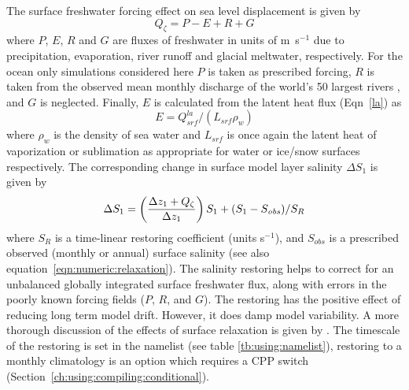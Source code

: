 The surface freshwater forcing effect on sea level displacement
is given by
\begin{equation}
\label{eqn:sfwf1}
Q_{\zeta} = P - E + R + G
\end{equation}
where $P$, $E$, $R$ and $G$ are fluxes of freshwater in units of \mbox{m s$^{-1}$} due to
precipitation, evaporation, river runoff and glacial meltwater, respectively.
For the ocean only simulations considered here 
$P$ is taken as prescribed forcing,
$R$ is taken from
the observed mean monthly discharge of the world's 50 largest rivers \citep{duemenil93},
and $G$ is neglected.
Finally, $E$ is calculated from the latent heat flux (Eqn~\ref{la}) as
\begin{equation}
\label{eqn:evap}
E = 
Q_{\mathit{srf}}^{\mathit{la}}/(L_{\mathit{srf}}\rho_{w})
\end{equation}
where 
$\rho_{w}$ is the density of sea water and $L_{\mathit{srf}}$
is once again the latent heat of vaporization or sublimation as appropriate
for water or ice/snow surfaces respectively.
The corresponding change in surface model layer salinity $\Delta S_1$ is given by
\begin{equation}
\label{eqn:numeric:sfwf2}
\Delta S_1 = \left( {\Delta z_1 + Q_{\zeta} \over {\Delta z_1}} \right) S_1 + ( S_1 - S_{\mathit{obs}})/S_R
\end{equation}
where 
$S_R$ is a time-linear restoring coefficient (units s$^{-1}$),
and $S_{\mathit{obs}}$ is a prescribed observed (monthly or annual) surface salinity (see also equation~\ref{eqn:numeric:relaxation}).
The salinity restoring helps to correct for an 
unbalanced globally integrated surface freshwater flux,
along with errors in the poorly known forcing fields ($P$, $R$, and $G$).
The restoring has the positive effect of reducing long term model drift.
However, it does damp model variability.
A more thorough discussion of the effects of surface relaxation is given by \citet{killworth2000}.
The timescale of the restoring is set in the namelist (see table \ref{tb:using:namelist}), restoring to a monthly climatology is an 
option which requires a CPP switch (Section~\ref{ch:using:compiling:conditional}).

